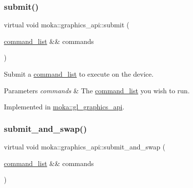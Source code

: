 \mbox{\label{classmoka_1_1graphics__api_abd438a03be4a08c1cd043a7cefa17cd9}} 
\subsubsection{\texorpdfstring{submit()}{submit()}}
{\footnotesize\ttfamily virtual void moka\+::graphics\+\_\+api\+::submit (\begin{DoxyParamCaption}\item[{\mbox{\hyperlink{classmoka_1_1command__list}{command\+\_\+list}} \&\&}]{commands }\end{DoxyParamCaption})\hspace{0.3cm}{\ttfamily [pure virtual]}}



Submit a \mbox{\hyperlink{classmoka_1_1command__list}{command\+\_\+list}} to execute on the device. 


\begin{DoxyParams}{Parameters}
{\em commands} & The \mbox{\hyperlink{classmoka_1_1command__list}{command\+\_\+list}} you wish to run. \\
\hline
\end{DoxyParams}


Implemented in \mbox{\hyperlink{classmoka_1_1gl__graphics__api_abdf61ff67554bb656181942efeac9454}{moka\+::gl\+\_\+graphics\+\_\+api}}.

\mbox{\label{classmoka_1_1graphics__api_a2b839d3a34c4eb88b0587e40f0616af3}} 
\subsubsection{\texorpdfstring{submit\_and\_swap()}{submit\_and\_swap()}}
{\footnotesize\ttfamily virtual void moka\+::graphics\+\_\+api\+::submit\+\_\+and\+\_\+swap (\begin{DoxyParamCaption}\item[{\mbox{\hyperlink{classmoka_1_1command__list}{command\+\_\+list}} \&\&}]{commands }\end{DoxyParamCaption})\hspace{0.3cm}{\ttfamily [pure virtual]}}



